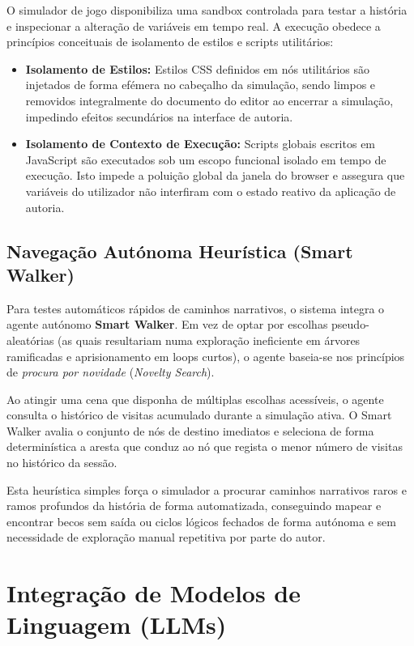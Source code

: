 O simulador de jogo disponibiliza uma sandbox controlada para testar a história e inspecionar a alteração de variáveis em tempo real. A execução obedece a princípios conceituais de isolamento de estilos e scripts utilitários:
\begin{itemize}
    \item \textbf{Isolamento de Estilos:} Estilos CSS definidos em nós utilitários são injetados de forma efémera no cabeçalho da simulação, sendo limpos e removidos integralmente do documento do editor ao encerrar a simulação, impedindo efeitos secundários na interface de autoria.
    
    \item \textbf{Isolamento de Contexto de Execução:} Scripts globais escritos em JavaScript são executados sob um escopo funcional isolado em tempo de execução. Isto impede a poluição global da janela do browser e assegura que variáveis do utilizador não interfiram com o estado reativo da aplicação de autoria.
\end{itemize}

\subsection{Navegação Autónoma Heurística (Smart Walker)}
\label{subsec:smart-walker-novelty}

Para testes automáticos rápidos de caminhos narrativos, o sistema integra o agente autónomo \textbf{Smart Walker}. Em vez de optar por escolhas pseudo-aleatórias (as quais resultariam numa exploração ineficiente em árvores ramificadas e aprisionamento em loops curtos), o agente baseia-se nos princípios de \textit{procura por novidade} (\textit{Novelty Search}).

Ao atingir uma cena que disponha de múltiplas escolhas acessíveis, o agente consulta o histórico de visitas acumulado durante a simulação ativa. O Smart Walker avalia o conjunto de nós de destino imediatos e seleciona de forma determinística a aresta que conduz ao nó que regista o menor número de visitas no histórico da sessão.

Esta heurística simples força o simulador a procurar caminhos narrativos raros e ramos profundos da história de forma automatizada, conseguindo mapear e encontrar becos sem saída ou ciclos lógicos fechados de forma autónoma e sem necessidade de exploração manual repetitiva por parte do autor.

\section{Integração de Modelos de Linguagem (LLMs)}
\label{sec:integracao-llms-implementacao}

